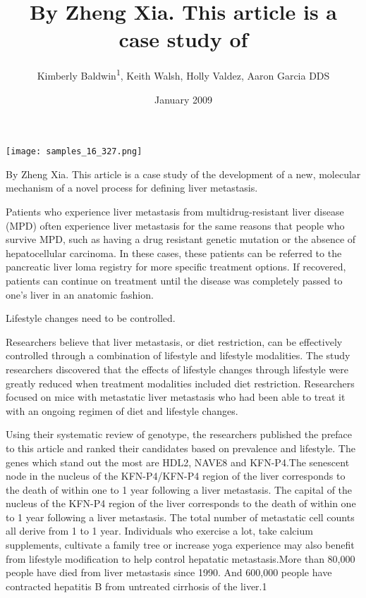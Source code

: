 \documentclass{article}
\title{By Zheng Xia. This article is a case study of}
\author{Kimberly Baldwin\textsuperscript{1},  Keith Walsh,  Holly Valdez,  Aaron Garcia DDS}
\affil{\textsuperscript{1}Hunan University}
\date{January 2009}
\begin{document}
\maketitle

\begin{center}
\begin{minipage}{0.75\linewidth}
\texttt{[image: samples\_16\_327.png]}
\end{minipage}
\end{center}

By Zheng Xia. This article is a case study of the development of a new, molecular mechanism of a novel process for defining liver metastasis.

Patients who experience liver metastasis from multidrug-resistant liver disease (MPD) often experience liver metastasis for the same reasons that people who survive MPD, such as having a drug resistant genetic mutation or the absence of hepatocellular carcinoma. In these cases, these patients can be referred to the pancreatic liver loma registry for more specific treatment options. If recovered, patients can continue on treatment until the disease was completely passed to one’s liver in an anatomic fashion.

Lifestyle changes need to be controlled.

Researchers believe that liver metastasis, or diet restriction, can be effectively controlled through a combination of lifestyle and lifestyle modalities. The study researchers discovered that the effects of lifestyle changes through lifestyle were greatly reduced when treatment modalities included diet restriction. Researchers focused on mice with metastatic liver metastasis who had been able to treat it with an ongoing regimen of diet and lifestyle changes.

Using their systematic review of genotype, the researchers published the preface to this article and ranked their candidates based on prevalence and lifestyle. The genes which stand out the most are HDL2, NAVE8 and KFN-P4.The senescent node in the nucleus of the KFN-P4/KFN-P4 region of the liver corresponds to the death of within one to 1 year following a liver metastasis. The capital of the nucleus of the KFN-P4 region of the liver corresponds to the death of within one to 1 year following a liver metastasis. The total number of metastatic cell counts all derive from 1 to 1 year. Individuals who exercise a lot, take calcium supplements, cultivate a family tree or increase yoga experience may also benefit from lifestyle modification to help control hepatatic metastasis.More than 80,000 people have died from liver metastasis since 1990. And 600,000 people have contracted hepatitis B from untreated cirrhosis of the liver.1
\end{document}
